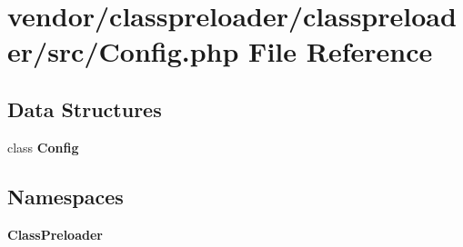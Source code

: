 \section{vendor/classpreloader/classpreloader/src/\+Config.php File Reference}
\label{classpreloader_2classpreloader_2src_2_config_8php}
\subsection*{Data Structures}
\begin{DoxyCompactItemize}
\item 
class {\bf Config}
\end{DoxyCompactItemize}
\subsection*{Namespaces}
\begin{DoxyCompactItemize}
\item 
 {\bf Class\+Preloader}
\end{DoxyCompactItemize}
